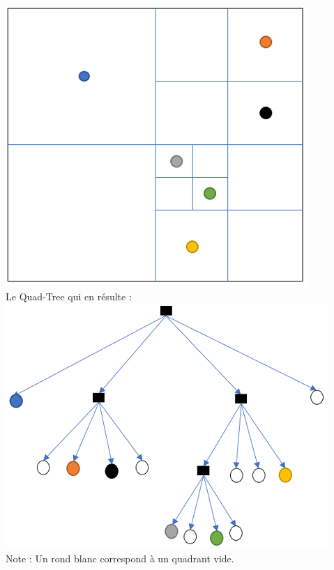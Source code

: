 \begin{Exercice}[10 minutes]
\begin{solution}
    \includegraphics[]{Quad-Tree 3 solution 1.PNG}\\
    
    Le Quad-Tree qui en résulte :\\
    
    \includegraphics[]{Quad-Tree 3 solution 2.PNG}\\
    
    Note : Un rond blanc correspond à un quadrant vide.
    
\end{solution}
\end{Exercice}


